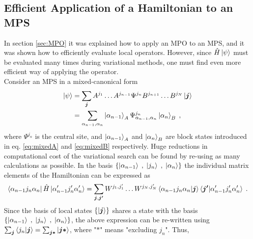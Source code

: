 \subsection{Efficient Application of a Hamiltonian to an MPS}
In section \ref{sec:MPO} it was explained how to apply an MPO to an MPS, and it was shown how to efficiently evaluate local operators. However, since $\hat{H} \ket{\psi}$ must be evaluated many times during variational methods, one must find even more efficient way of applying the operator.\\
Consider an MPS in a mixed-canonical form
\begin{align}
	\ket{\psi} &= \sum_{\boldsymbol{j}} A^{j_1} \ldots A^{j_{n-1}} \Psi^{j_n} B^{j_{n+1}} \ldots B^{j_{N}} \ket{\boldsymbol{j}} \nonumber \\
	&= \sum_{\alpha_{n-1} , \alpha_{n}} \ket{\alpha_{n-1}}_A \Psi_{\alpha_{n-1} , \alpha_{n}}^{j_n}  \ket{\alpha_{n}}_B \; ,
	\label{eq:MPSmixedsingle}
\end{align}
where $\Psi^{j_n}$ is the central site, and $\ket{\alpha_{n-1}}_A$ and $\ket{\alpha_{n}}_B$ are block states introduced in eq. \eqref{eq:mixedA} and \eqref{eq:mixedB} respectively.
Huge reductions in computational cost of the variational search can be found by re-using as many calculations as possible. In the basis $\{ \ket{\alpha_{n-1} } \; , \; \ket{ j_n } \; , \; \ket{\alpha_{n} } \}$ the individual matrix elements of the Hamiltonian can be expressed as
\begin{equation*}
	\bra{\alpha_{n-1} j_n \alpha_{n}} \hat{H} \ket{\alpha_{n-1} ' j_n ' \alpha_{n} '} = \sum_{\boldsymbol{j} , \boldsymbol{j'}}  W^{j_1 , j_1 '} \ldots W^{j_N , j_N '}  \braket{\alpha_{n-1} j_n \alpha_{n} | \boldsymbol{j}} \braket{\boldsymbol{j'} | \alpha_{n-1} ' j_n ' \alpha_{n} '} \; . 
\end{equation*}
Since the basis of local states $\{ \ket{\boldsymbol{j}} \}$ shares a state with the basis $\{ \ket{\alpha_{n-1} } \; , \; \ket{ j_n } \; , \; \ket{\alpha_{n} } \}$, the above expression can be re-written using $\sum_{\boldsymbol{j}} \braket{j_n | \boldsymbol{j}} = \sum_{\boldsymbol{j *}} \ket{ \boldsymbol{j *}}$, where "$\boldsymbol{*}$" means "excluding $j_n$". Thus,
